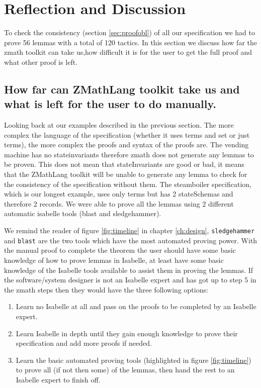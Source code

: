 \section{Reflection and Discussion}

To check the consistency (section \ref{sec:proofobl}) of all our specification we had to prove 56 lemmas with
a total of 120 tactics. In this section we discuss how far the \gls{zmath}
toolkit can take us,how difficult it is for the user to get the full proof and
what other proof is left.

\subsection{How far can ZMathLang toolkit take us and what is left for the user to do manually.}

Looking back at our examples described in the previous section. The more
complex the language of the specification (whether it uses terms and set or just
terms), the more complex the proofs and syntax of the proofs are. The vending
machine has no stateinvariants therefore \gls{zmath} does not generate any
lemmas to be proven. This does not mean that stateInvariants are good or bad, it
means that the ZMathLang toolkit will be unable to generate any lemma to check
for the  consistency of the specification without them. The steamboiler specification, which is our longest
example, uses only terms but has 2 stateSchemas and therefore 2 records. We were
able to prove all the lemmas using 2 different automatic isabelle tools (blast
and sledgehammer).

We remind the reader of figure \ref{fig:timeline} in chapter \ref{ch:design},
\verb|sledgehammer| and \verb|blast| are the two tools which have the most
automated proving power. With the manual proof to complete the theorem the user
should have some basic knowledge of how to prove lemmas in Isabelle, at least
have some basic knowledge of the Isabelle tools available to assist them in
proving the lemmas. If the software/system designer is not an Isabelle expert
and has got up to step 5 in the \gls{zmath} steps then they would have the three
following options:

\begin{enumerate}
\item Learn no Isabelle at all and pass on the proofs to be completed by an
Isabelle expert.

\item Learn Isabelle in depth until they gain enough knowledge to prove their
specification and add more proofs if needed.

\item Learn the basic automated proving tools (highlighted in figure
\ref{fig:timeline}) to prove all (if not then some) of the lemmas, then hand the
rest to an Isabelle expert to finish off.
\end{enumerate}

